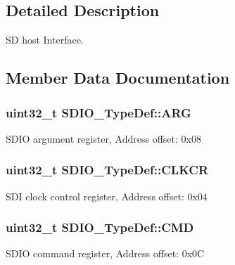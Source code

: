 \subsection{Detailed Description}
SD host Interface. 

\subsection{Member Data Documentation}
\subsubsection[{\texorpdfstring{A\+RG}{ARG}}]{ uint32\+\_\+t S\+D\+I\+O\+\_\+\+Type\+Def\+::\+A\+RG}\hypertarget{struct_s_d_i_o___type_def_a3e24392875e98cd09043e54a0990ab7a}{}\label{struct_s_d_i_o___type_def_a3e24392875e98cd09043e54a0990ab7a}
S\+D\+IO argument register, Address offset\+: 0x08 
\subsubsection[{\texorpdfstring{C\+L\+K\+CR}{CLKCR}}]{ uint32\+\_\+t S\+D\+I\+O\+\_\+\+Type\+Def\+::\+C\+L\+K\+CR}\hypertarget{struct_s_d_i_o___type_def_aeb1e30ce2038628e45264f75e5e926bb}{}\label{struct_s_d_i_o___type_def_aeb1e30ce2038628e45264f75e5e926bb}
S\+DI clock control register, Address offset\+: 0x04 
\subsubsection[{\texorpdfstring{C\+MD}{CMD}}]{ uint32\+\_\+t S\+D\+I\+O\+\_\+\+Type\+Def\+::\+C\+MD}\hypertarget{struct_s_d_i_o___type_def_abbbdc3174e12dab21123d746d65f345d}{}\label{struct_s_d_i_o___type_def_abbbdc3174e12dab21123d746d65f345d}
S\+D\+IO command register, Address offset\+: 0x0C 
